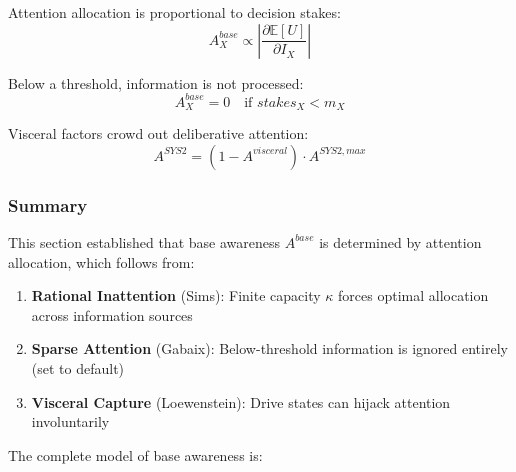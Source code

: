 \begin{tcolorbox}[colback=gray!5!white, colframe=gray!75!black, title=Axiom AWX-A08: Stakes-Dependent Attention]
Attention allocation is proportional to decision stakes:
\begin{equation}
A^{base}_X \propto \left|\frac{\partial \mathbb{E}[U]}{\partial I_X}\right|
\end{equation}
\end{tcolorbox}

\begin{tcolorbox}[colback=gray!5!white, colframe=gray!75!black, title=Axiom AWX-A09: Sparsity Threshold]
Below a threshold, information is not processed:
\begin{equation}
A^{base}_X = 0 \quad \text{if } stakes_X < m_X
\end{equation}
\end{tcolorbox}

\begin{tcolorbox}[colback=gray!5!white, colframe=gray!75!black, title=Axiom AWX-A10: Visceral Capture]
Visceral factors crowd out deliberative attention:
\begin{equation}
A^{SYS2} = (1 - A^{visceral}) \cdot A^{SYS2,max}
\end{equation}
\end{tcolorbox}

\subsubsection{Summary}
\label{subsubsec:summary}

This section established that base awareness $A^{base}$ is determined by 
attention allocation, which follows from:

\begin{enumerate}
\item \textbf{Rational Inattention} (Sims): Finite capacity $\kappa$ forces 
      optimal allocation across information sources
\item \textbf{Sparse Attention} (Gabaix): Below-threshold information is 
      ignored entirely (set to default)
\item \textbf{Visceral Capture} (Loewenstein): Drive states can hijack 
      attention involuntarily
\end{enumerate}

The complete model of base awareness is:

